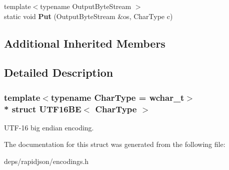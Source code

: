 \begin{DoxyCompactItemize}
\item 
{\footnotesize template$<$typename Output\+Byte\+Stream $>$ }\\static void {\bfseries Put} (Output\+Byte\+Stream \&os, Char\+Type c)\hypertarget{struct_u_t_f16_b_e_ab0f964c3ec9ac6cc47f2875ae112dbfe}{}\label{struct_u_t_f16_b_e_ab0f964c3ec9ac6cc47f2875ae112dbfe}

\end{DoxyCompactItemize}
\subsection*{Additional Inherited Members}


\subsection{Detailed Description}
\subsubsection*{template$<$typename Char\+Type = wchar\+\_\+t$>$\\*
struct U\+T\+F16\+B\+E$<$ Char\+Type $>$}

U\+T\+F-\/16 big endian encoding. 

The documentation for this struct was generated from the following file\+:\begin{DoxyCompactItemize}
\item 
deps/rapidjson/encodings.\+h\end{DoxyCompactItemize}

